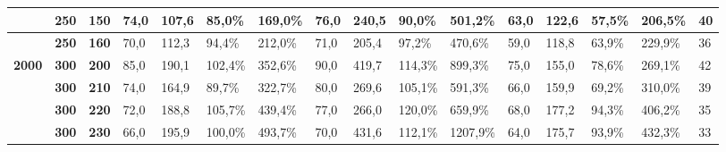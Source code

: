 \documentclass[conference,compsoc]{IEEEtran}
\begin{document}
\begin{adjustbox}{angle=90,width={\textwidth},totalheight={22cm},keepaspectratio,caption={Tabela de Resultados},center={14cm}}
\begin{tabular}{|l|l|l|l|l|l|l|l|l|l|l|l|l|l|l|l|}
\textbf{}                                            & \textbf{250}                                     & \textbf{150}                                        & 74,0            & 107,6          & 85,0\%              & 169,0\%            & 76,0            & 240,5          & 90,0\%              & 501,2\%            & 63,0            & 122,6          & 57,5\%              & 206,5\%            & 40                               \\ \hline
\textbf{}                                            & \textbf{250}                                     & \textbf{160}                                        & 70,0            & 112,3          & 94,4\%              & 212,0\%            & 71,0            & 205,4          & 97,2\%              & 470,6\%            & 59,0            & 118,8          & 63,9\%              & 229,9\%            & 36                               \\ \hline
\textbf{2000}                                        & \textbf{300}                                     & \textbf{200}                                        & 85,0            & 190,1          & 102,4\%             & 352,6\%            & 90,0            & 419,7          & 114,3\%             & 899,3\%            & 75,0            & 155,0          & 78,6\%              & 269,1\%            & 42                               \\ \hline
\textbf{}                                            & \textbf{300}                                     & \textbf{210}                                        & 74,0            & 164,9          & 89,7\%              & 322,7\%            & 80,0            & 269,6          & 105,1\%             & 591,3\%            & 66,0            & 159,9          & 69,2\%              & 310,0\%            & 39                               \\ \hline
\textbf{}                                            & \textbf{300}                                     & \textbf{220}                                        & 72,0            & 188,8          & 105,7\%             & 439,4\%            & 77,0            & 266,0          & 120,0\%             & 659,9\%            & 68,0            & 177,2          & 94,3\%              & 406,2\%            & 35                               \\ \hline
\textbf{}                                            & \textbf{300}                                     & \textbf{230}                                        & 66,0            & 195,9          & 100,0\%             & 493,7\%            & 70,0            & 431,6          & 112,1\%             & 1207,9\%           & 64,0            & 175,7          & 93,9\%              & 432,3\%            & 33                               \\ \hline
\end{tabular}
\end{adjustbox}
 
\end{document}
